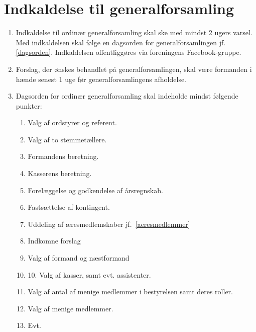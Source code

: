 \documentclass[a4paper, 10pt]{article}
\newenvironment{stykenum}{
  \begin{enumerate}[%
    label=Stk.~\arabic*:, ref=\textsection~\theenumi~Stk.~\arabic*, start=1]
}{\end{enumerate}}
\begin{document}
\section{Indkaldelse til generalforsamling}
\begin{stykenum}
    \item Indkaldelse til ordinær generalforsamling skal ske med mindst 2 ugers
        varsel. Med indkaldelsen skal følge en dagsorden for generalforsamlingen
        jf. \ref{dagsorden}. Indkaldelsen offentliggøres via foreningens
        Facebook-gruppe.

    \item Forslag, der ønskes behandlet på generalforsamlingen, skal være
        formanden i hænde senest 1 uge før generalforsamlingens afholdelse.

    \item \label{dagsorden} Dagsorden for ordinær generalforsamling skal
        indeholde mindst følgende punkter:
        \begin{enumerate}[label=\arabic*.]
            \item Valg af ordstyrer og referent.

            \item Valg af to stemmetællere.

            \item Formandens beretning.

            \item Kasserens beretning.

            \item Forelæggelse og godkendelse af årsregnskab.

            \item Fastsættelse af kontingent.

            \item Uddeling af æresmedlemskaber jf.~\ref{aeresmedlemmer}

            \item Indkomne forslag

            \item Valg af formand og næstformand

            \item 10. Valg af kasser, samt evt.  assistenter.

            \item Valg af antal af menige medlemmer i bestyrelsen samt deres
                roller.

            \item Valg af menige medlemmer.

            \item Evt.
        \end{enumerate}
\end{stykenum}
\end{document}
